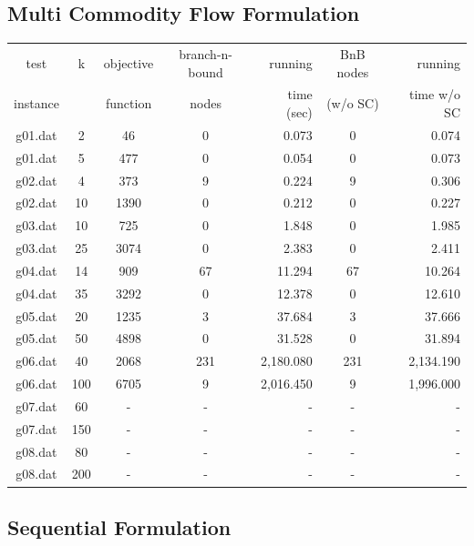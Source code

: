 \documentclass[,%
			paper=a4,%
			DIV14,
			liststotoc,
			bibtotoc,
			draft=false,%
			numbers=noendperiod
			]{scrartcl}
\begin{document}
\subsection{Multi Commodity Flow Formulation}

\begin{tabular}{||c||cccr|cr||}
\hline
test     & k & objective  & branch-n-bound & running   & BnB nodes & running\\
instance &   & function   & nodes          & time (sec)& (w/o SC)  & time w/o SC \\
\hline

g01.dat	&	2	&	46	&	0	&	0.073	&	0	&	0.074	\\
g01.dat	&	5	&	477	&	0	&	0.054	&	0	&	0.073	\\
g02.dat	&	4	&	373	&	9	&	0.224	&	9	&	0.306	\\
g02.dat	&	10	&	1390	&	0	&	0.212	&	0	&	0.227	\\
g03.dat	&	10	&	725	&	0	&	1.848	&	0	&	1.985	\\
g03.dat	&	25	&	3074	&	0	&	2.383	&	0	&	2.411	\\
g04.dat	&	14	&	909	&	67	&	11.294	&	67	&	10.264	\\
g04.dat	&	35	&	3292	&	0	&	12.378	&	0	&	12.610	\\
g05.dat	&	20	&	1235	&	3	&	37.684	&	3	&	37.666	\\
g05.dat	&	50	&	4898	&	0	&	31.528	&	0	&	31.894	\\
g06.dat	&	40	&	2068	&	231	&	2,180.080	&	231	&	2,134.190	\\
g06.dat	&	100	&	6705	&	9	&	2,016.450	&	9	&	1,996.000	\\
g07.dat	&	60	&	-	&	-	&	-	&	-	&	-	\\
g07.dat	&	150	&	-	&	-	&	-	&	-	&	-	\\
g08.dat	&	80	&	-	&	-	&	-	&	-	&	-	\\
g08.dat	&	200	&	-	&	-	&	-	&	-	&	-	\\

\hline
\end{tabular}


\subsection{Sequential Formulation}
\end{document}
